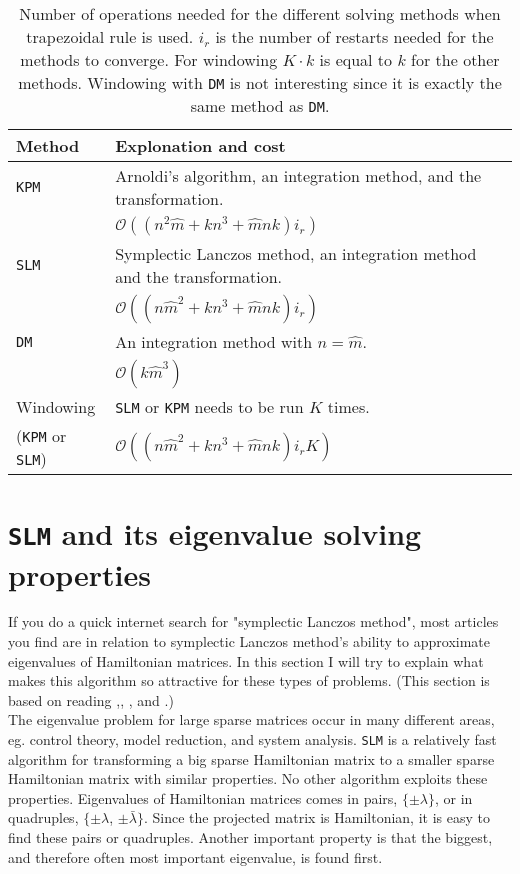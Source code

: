 \begin{table}
\caption{ Number of operations needed for the different solving methods when trapezoidal rule is used. $i_r$ is the number of restarts needed for the methods to converge. For windowing $K\cdot k$ is equal to $k$ for the other methods. Windowing with \texttt{DM} is not interesting since it is exactly the same method as \texttt{DM}. }
\centering
\begin{tabular}{l | l}
Method & Explonation and cost \\
\hline
\texttt{KPM} & Arnoldi's algorithm, an integration method, and the transformation.
\\ & $ \mathcal{O}((n^2 \hat{m} + k n^3 + \hat{m}nk)i_r)$ \\ 
\texttt{SLM} & Symplectic Lanczos method, an integration method and the transformation. 
\\ & $ \mathcal{O}((n \hat{m}^2 + k n^3 + \hat{m}nk)i_r) $  \\
\texttt{DM} & An integration method with $n = \hat{m}$. 
\\  & $\mathcal{O}(k\hat{m}^3)$ \\
Windowing  & \texttt{SLM} or \texttt{KPM} needs to be run $K$ times. \\ (\texttt{KPM} or \texttt{SLM}) & $\mathcal{O}((n \hat{m}^2 + k n^3 + \hat{m}nk)i_r K)$ \\
\end{tabular}
\label{tab:cc}

\end{table}

\section{\texttt{SLM} and its eigenvalue solving properties} %
If you do a quick internet search for "symplectic Lanczos method", most articles you find are in relation to symplectic Lanczos method's ability to approximate eigenvalues of Hamiltonian matrices. In this section I will try to explain what makes this algorithm so attractive for these types of problems. (This section is based on reading \cite{SLM1},\cite{SLM2}, \cite{SLM3}, and \cite{SLM4}.) \\

\noindent The eigenvalue problem for large sparse matrices occur in many different areas, eg. control theory, model reduction, and system analysis. 
\noindent \texttt{SLM} is a relatively fast algorithm for transforming a big sparse Hamiltonian matrix to a smaller sparse Hamiltonian matrix with similar properties. No other algorithm exploits these properties. Eigenvalues of Hamiltonian matrices comes in pairs, $\{ \pm \lambda \} $, or in quadruples, $\{ \pm \lambda $, $\pm \bar{\lambda} \} $. Since the projected matrix is Hamiltonian, it is easy to find these pairs or quadruples. Another important property is that the biggest, and therefore often most important eigenvalue, is found first.  \\

